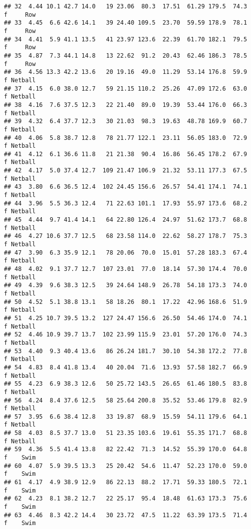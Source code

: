 \documentclass[
]{article}
\begin{document}
\begin{verbatim}
## 32  4.44 10.1 42.7 14.0   19 23.06  80.3  17.51  61.29 179.5  74.3   f     Row
## 33  4.45  6.6 42.6 14.1   39 24.40 109.5  23.70  59.59 178.9  78.1   f     Row
## 34  4.41  5.9 41.1 13.5   41 23.97 123.6  22.39  61.70 182.1  79.5   f     Row
## 35  4.87  7.3 44.1 14.8   13 22.62  91.2  20.43  62.46 186.3  78.5   f     Row
## 36  4.56 13.3 42.2 13.6   20 19.16  49.0  11.29  53.14 176.8  59.9   f Netball
## 37  4.15  6.0 38.0 12.7   59 21.15 110.2  25.26  47.09 172.6  63.0   f Netball
## 38  4.16  7.6 37.5 12.3   22 21.40  89.0  19.39  53.44 176.0  66.3   f Netball
## 39  4.32  6.4 37.7 12.3   30 21.03  98.3  19.63  48.78 169.9  60.7   f Netball
## 40  4.06  5.8 38.7 12.8   78 21.77 122.1  23.11  56.05 183.0  72.9   f Netball
## 41  4.12  6.1 36.6 11.8   21 21.38  90.4  16.86  56.45 178.2  67.9   f Netball
## 42  4.17  5.0 37.4 12.7  109 21.47 106.9  21.32  53.11 177.3  67.5   f Netball
## 43  3.80  6.6 36.5 12.4  102 24.45 156.6  26.57  54.41 174.1  74.1   f Netball
## 44  3.96  5.5 36.3 12.4   71 22.63 101.1  17.93  55.97 173.6  68.2   f Netball
## 45  4.44  9.7 41.4 14.1   64 22.80 126.4  24.97  51.62 173.7  68.8   f Netball
## 46  4.27 10.6 37.7 12.5   68 23.58 114.0  22.62  58.27 178.7  75.3   f Netball
## 47  3.90  6.3 35.9 12.1   78 20.06  70.0  15.01  57.28 183.3  67.4   f Netball
## 48  4.02  9.1 37.7 12.7  107 23.01  77.0  18.14  57.30 174.4  70.0   f Netball
## 49  4.39  9.6 38.3 12.5   39 24.64 148.9  26.78  54.18 173.3  74.0   f Netball
## 50  4.52  5.1 38.8 13.1   58 18.26  80.1  17.22  42.96 168.6  51.9   f Netball
## 51  4.25 10.7 39.5 13.2  127 24.47 156.6  26.50  54.46 174.0  74.1   f Netball
## 52  4.46 10.9 39.7 13.7  102 23.99 115.9  23.01  57.20 176.0  74.3   f Netball
## 53  4.40  9.3 40.4 13.6   86 26.24 181.7  30.10  54.38 172.2  77.8   f Netball
## 54  4.83  8.4 41.8 13.4   40 20.04  71.6  13.93  57.58 182.7  66.9   f Netball
## 55  4.23  6.9 38.3 12.6   50 25.72 143.5  26.65  61.46 180.5  83.8   f Netball
## 56  4.24  8.4 37.6 12.5   58 25.64 200.8  35.52  53.46 179.8  82.9   f Netball
## 57  3.95  6.6 38.4 12.8   33 19.87  68.9  15.59  54.11 179.6  64.1   f Netball
## 58  4.03  8.5 37.7 13.0   51 23.35 103.6  19.61  55.35 171.7  68.8   f Netball
## 59  4.36  5.5 41.4 13.8   82 22.42  71.3  14.52  55.39 170.0  64.8   f    Swim
## 60  4.07  5.9 39.5 13.3   25 20.42  54.6  11.47  52.23 170.0  59.0   f    Swim
## 61  4.17  4.9 38.9 12.9   86 22.13  88.2  17.71  59.33 180.5  72.1   f    Swim
## 62  4.23  8.1 38.2 12.7   22 25.17  95.4  18.48  61.63 173.3  75.6   f    Swim
## 63  4.46  8.3 42.2 14.4   30 23.72  47.5  11.22  63.39 173.5  71.4   f    Swim

\end{verbatim}
\end{document}
